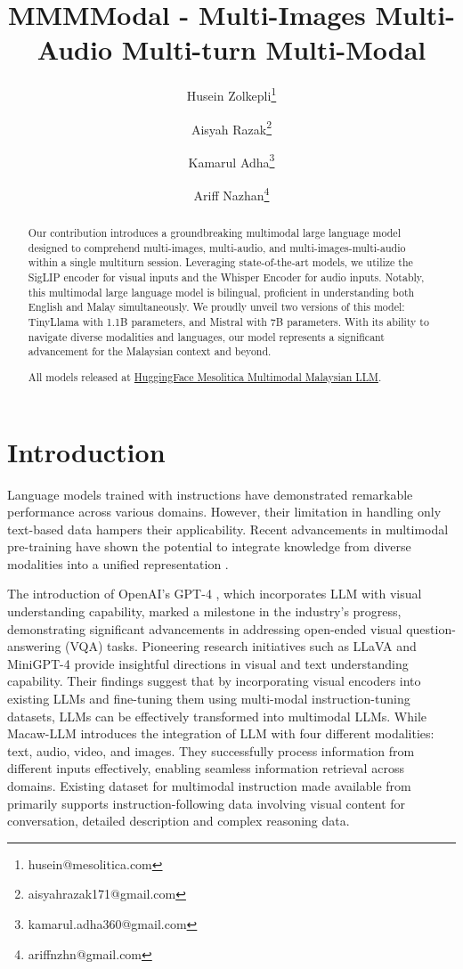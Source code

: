 \documentclass[preprint]{article}
\title{MMMModal - Multi-Images Multi-Audio Multi-turn Multi-Modal}
\author{
  Husein Zolkepli\thanks{husein@mesolitica.com} \and
  Aisyah Razak\thanks{aisyahrazak171@gmail.com} \and
  Kamarul Adha\thanks{kamarul.adha360@gmail.com} \and
  Ariff Nazhan\thanks{ariffnzhn@gmail.com}
}
\begin{document}
\maketitle

\begin{abstract}

  Our contribution introduces a groundbreaking multimodal large language model designed to comprehend multi-images, multi-audio, and multi-images-multi-audio within a single multiturn session. Leveraging state-of-the-art models, we utilize the SigLIP encoder for visual inputs and the Whisper Encoder for audio inputs. Notably, this multimodal large language model is bilingual, proficient in understanding both English and Malay simultaneously. We proudly unveil two versions of this model: TinyLlama with 1.1B parameters, and Mistral with 7B parameters. With its ability to navigate diverse modalities and languages, our model represents a significant advancement for the Malaysian context and beyond.

  All models released at \href{https://huggingface.co/collections/mesolitica/multimodal-malaysian-llm-65c6f893e03f78fa9e5c8859}{HuggingFace Mesolitica Multimodal Malaysian LLM}.

\end{abstract}

\section{Introduction}


Language models trained with instructions have demonstrated remarkable performance across various domains. However, their limitation in handling only text-based data hampers their applicability. Recent advancements in multimodal pre-training have shown the potential to integrate knowledge from diverse modalities into a unified representation \cite{lyu2023macawllm,liu2023visual,openai2023gpt4}.

The introduction of OpenAI's GPT-4 \cite{openai2023gpt4}, which incorporates LLM with visual understanding capability, marked a milestone in the industry's progress, demonstrating significant advancements in addressing open-ended visual question-answering (VQA) tasks. Pioneering research initiatives such as LLaVA \cite{liu2023visual} and MiniGPT-4 \cite{zhu2023minigpt4} provide insightful directions in visual and text understanding capability. Their findings suggest that by incorporating visual encoders into existing LLMs and fine-tuning them using multi-modal instruction-tuning datasets, LLMs can be effectively transformed into multimodal LLMs. While Macaw-LLM \cite{lyu2023macawllm} introduces the integration of LLM with four different modalities: text, audio, video, and images. They successfully process information from different inputs effectively, enabling seamless information retrieval across domains. Existing dataset for multimodal instruction made available from \cite{liu2023visual} primarily supports instruction-following data involving visual content for conversation, detailed description and complex reasoning data.
\end{document}
